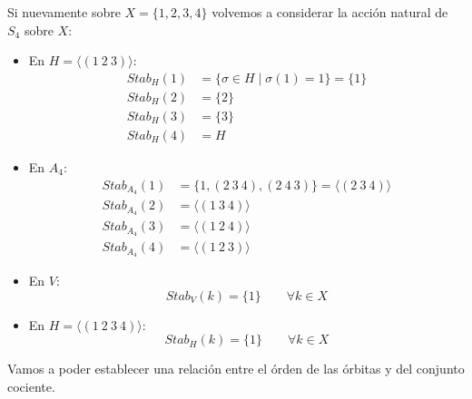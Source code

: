 \begin{ejemplo}
    Si nuevamente sobre $X = \{1,2,3,4\}$ volvemos a considerar la acción natural de $S_4$ sobre $X$:
    \begin{itemize}
        \item En $H = \langle (1\ 2\ 3) \rangle $:
            \begin{align*}
                Stab_H(1) &= \{\sigma\in H \mid \sigma(1) = 1\} = \{1\} \\
                Stab_H(2) &= \{2\} \\
                Stab_H(3) &= \{3\} \\
                Stab_H(4) &= H
            \end{align*}
        \item En $A_4$:
            \begin{align*}
                Stab_{A_4}(1) &= \{1, (2\ 3\ 4), (2\ 4\ 3)\} = \langle (2\ 3\ 4) \rangle  \\
                Stab_{A_4}(2) &= \langle (1\ 3\ 4) \rangle  \\
                Stab_{A_4}(3) &= \langle (1\ 2\ 4) \rangle  \\
                Stab_{A_4}(4) &= \langle (1\ 2\ 3) \rangle  
            \end{align*}
        \item En $V$:
            \begin{equation*}
                Stab_V(k) = \{1\} \qquad \forall k\in X
            \end{equation*}
        \item En $H = \langle (1\ 2\ 3\ 4) \rangle $:
            \begin{equation*}
                Stab_H(k) = \{1\} \qquad \forall k\in X
            \end{equation*}
    \end{itemize}
\end{ejemplo}

Vamos a poder establecer una relación entre el órden de las órbitas y del conjunto cociente.

